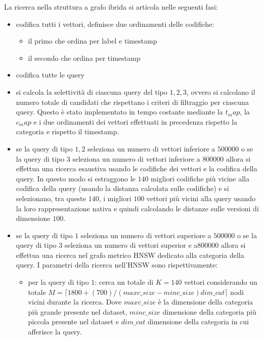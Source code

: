 La ricerca nella struttura a grafo ibrida si articola nelle seguenti fasi:
\begin{itemize}
    \item codifica tutti i vettori, definisce due ordinamenti delle codifiche:
    \begin{itemize}
        \item il primo che ordina per label e timestamp
        \item il secondo che ordina per timestamp
    \end{itemize}
    \item codifica tutte le query
    \item si calcola la selettività di ciascuna query del tipo $1,2,3$, ovvero 
    si calcolano il numero totale di candidati che rispettano i criteri di filtraggio 
    per ciascuna query. Questo è stato implementato in tempo costante mediante la 
    $t_map$, la $c_map$ e i due ordinamenti dei vettori effettuati in precedenza rispetto 
    la categoria e rispetto il timestamp. 
    \item se la query di tipo $1,2$ seleziona un numero di vettori 
    inferiore a $500000$ o se la query di tipo $3$ seleziona un numero di vettori 
    inferiore a $800000$ allora si effettua una ricerca esaustiva usando le codifiche 
    dei vettori e la codifica della query. In questo modo si estraggono le $140$
    migliori codifiche più vicine alla codifica della query (usando la distanza 
    calcolata sulle codifiche) e si selezionano, tra queste $140$, i migliori $100$
    vettori più vicini alla query usando la loro rappresentazione nativa e quindi 
    calcolando le distanze sulle versioni di dimensione $100$.
    \item se la query di tipo $1$ seleziona un numero di vettori 
    superiore a $500000$ o se la query di tipo $3$ seleziona un numero di vettori 
    superior e a$800000$ allora si effettua una ricerca nel grafo metrico HNSW 
    dedicato alla categoria della query. I parametri della ricerca nell'HNSW sono
    rispettivamente:
    \begin{itemize}
        \item per la query di tipo $1$: cerca un totale di $K=140$ vettori considerando 
        un totale $M= \lceil1800+(700)/(maxc\_size - minc\_size)dim\_cat\rceil$ 
        nodi vicini durante la ricerca. Dove $maxc\_size$ è la dimensione della categoria 
        più grande presente 
        nel dataset, $minc\_size$ dimensione della categoria più piccola presente 
        nel dataset e $dim\_cat$ dimensione della categoria in cui afferisce la query.

\end{itemize}
\end{itemize}
